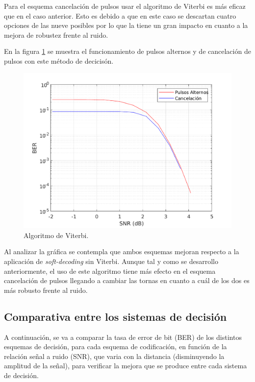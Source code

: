 Para el esquema cancelación de pulsos usar el algoritmo de Viterbi es más eficaz que 
en el caso anterior. Esto es debido a que en este caso se descartan cuatro opciones de 
las nueve posibles por lo que la tiene un gran impacto en cuanto a la mejora de 
robustez frente al ruido.

En la figura \ref{viterbi} se muestra el funcionamiento de pulsos alternos y de cancelación de pulsos
con este método de decicisón.

\begin{figure}[ht]
    \centering
    \includegraphics[scale=0.6]{./figuras/Viterbi.pdf}
    \caption{\small{Algoritmo de Viterbi.}}
    \label{viterbi}%
\end{figure}

Al analizar la gráfica se contempla que ambos esquemas mejoran respecto a la aplicación
de \textit{soft-decoding} sin Viterbi. Aunque tal y como se desarrollo anteriormente,
el uso de este algoritmo tiene más efecto en el esquema cancelación de pulsos llegando
a cambiar las tornas en cuanto a cuál de los dos es más robusto frente al ruido.


\subsection{Comparativa entre los sistemas de decisión}
A continuación, se va a comparar la tasa de error de bit (BER) de los distintos esquemas de decisión, para cada esquema 
de codificación, en función de la relación señal a ruido (SNR), que varia con la distancia (disminuyendo la 
amplitud de la señal), para verificar la mejora que se produce entre cada sistema de decisión.

